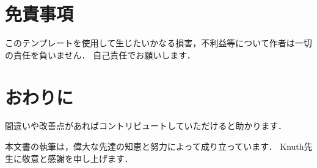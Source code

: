 \documentclass[fontsize=9bp,twocolumn,column_gap=2.36zw,a4paper,report]{jlreq}
\newcommand{\acknowledgement}{%
	{\fontsize{10.5bp}{16bp}\selectfont\bfseries\centering{謝\ \ \ \ \ \ 辞}\par}
}
\begin{document}
\chapter{免責事項}

このテンプレートを使用して生じたいかなる損害，不利益等について作者は一切の責任を負いません．
自己責任でお願いします．
\newline

\chapter{おわりに}

間違いや改善点があればコントリビュートしていただけると助かります．
\newline

\acknowledgement
本文書の執筆は，偉大な先達の知恵と努力によって成り立っています．
Knuth先生に敬意と感謝を申し上げます．
\newline



\end{document}
